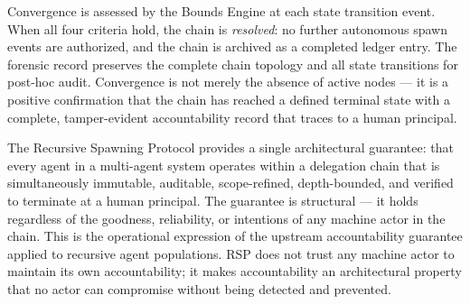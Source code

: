 Convergence is assessed by the Bounds Engine at each state transition event. When all four criteria hold, the chain is \emph{resolved}: no further autonomous spawn events are authorized, and the chain is archived as a completed ledger entry. The forensic record preserves the complete chain topology and all state transitions for post-hoc audit. Convergence is not merely the absence of active nodes — it is a positive confirmation that the chain has reached a defined terminal state with a complete, tamper-evident accountability record that traces to a human principal.

\medskip

The Recursive Spawning Protocol provides a single architectural guarantee: that every agent in a multi-agent system operates within a delegation chain that is simultaneously immutable, auditable, scope-refined, depth-bounded, and verified to terminate at a human principal. The guarantee is structural — it holds regardless of the goodness, reliability, or intentions of any machine actor in the chain. This is the operational expression of the upstream \bxthree{} accountability guarantee applied to recursive agent populations. RSP does not trust any machine actor to maintain its own accountability; it makes accountability an architectural property that no actor can compromise without being detected and prevented.